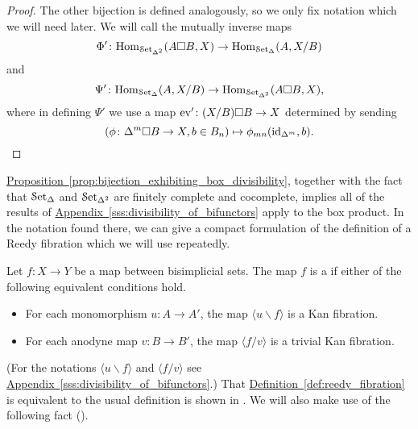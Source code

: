 \documentclass[main.tex]{subfiles}
\begin{document}
\begin{proof}
  The other bijection is defined analogously, so we only fix notation which we will need later. We will call the mutually inverse maps
  \begin{equation*}
    \Phi'\colon \mathrm{Hom}_{\mathcal{S}\mathrm{et}_{\Delta^{2}}}(A \square B, X) \to \mathrm{Hom}_{\mathcal{S}\mathrm{et}_{\Delta}}(A, X / B)
  \end{equation*}
  and
  \begin{equation*}
    \Psi'\colon \mathrm{Hom}_{\mathcal{S}\mathrm{et}_{\Delta}}(A, X / B) \to \mathrm{Hom}_{\mathcal{S}\mathrm{et}_{\Delta^{2}}}(A \square B, X),
  \end{equation*}
  where in defining $\Psi'$ we use a map $\mathrm{ev}'\colon (X / B) \square B \to X$ determined by sending
  \begin{equation*}
    (\phi\colon \Delta^{m} \square B \to X, b \in B_{n}) \mapsto \phi_{mn}(\mathrm{id}_{\Delta^{m}}, b).\qedhere
  \end{equation*}
\end{proof}


\hyperref[prop:bijection_exhibiting_box_divisibility]{Proposition~\ref*{prop:bijection_exhibiting_box_divisibility}}, together with the fact that $\mathcal{S}\mathrm{et}_{\Delta}$ and $\mathcal{S}\mathrm{et}_{\Delta^{2}}$ are finitely complete and cocomplete, implies all of the results of \hyperref[sss:divisibility_of_bifunctors]{Appendix~\ref*{sss:divisibility_of_bifunctors}} apply to the box product. In the notation found there, we can give a compact formulation of the definition of a Reedy fibration which we will use repeatedly.

\begin{definition}
  \label{def:reedy_fibration}
  Let $f\colon X \to Y$ be a map between bisimplicial sets. The map $f$ is a  if either of the following equivalent conditions hold.
  \begin{itemize}
    \item For each monomorphism $u\colon A \to A'$, the map $\langle u \backslash f \rangle$ is a Kan fibration.

    \item For each anodyne map $v\colon B \to B'$, the map $\langle f / v \rangle$ is a trivial Kan fibration.
  \end{itemize}
\end{definition}

(For the notations $\langle u \backslash f \rangle$ and $\langle f / v \rangle$ see \hyperref[sss:divisibility_of_bifunctors]{Appendix~\ref*{sss:divisibility_of_bifunctors}}.) That \hyperref[def:reedy_fibration]{Definition~\ref*{def:reedy_fibration}} is equivalent to the usual definition is shown in \cite[Prop.\ 3.4]{qcats_vs_segal_spaces}. We will also make use of the following fact (\cite[Prop.\ 3.10]{qcats_vs_segal_spaces}).
\end{document}
